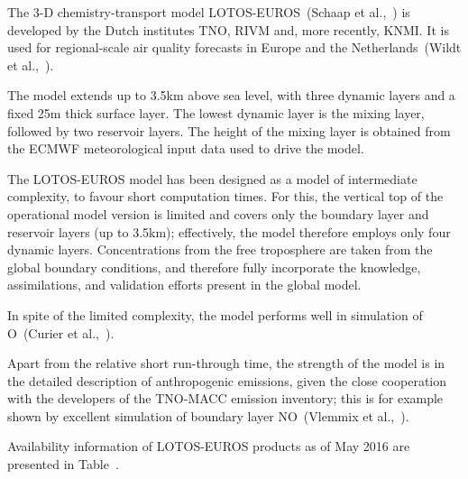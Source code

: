 \documentclass[9pt]{report}
\begin{document}
\noindent{}The 3-D chemistry-transport model LOTOS-EUROS~(Schaap et al.,~) is developed by the Dutch institutes TNO, RIVM and, more recently, KNMI.
It is used for regional-scale air quality forecasts in Europe and the Netherlands~(Wildt et al.,~).%

The model extends up to 3.5km above sea level, with three dynamic layers and a ﬁxed 25m thick surface layer.
The lowest dynamic layer is the mixing layer, followed by two reservoir layers.
The height of the mixing layer is obtained from the ECMWF meteorological input data used to drive the model.%

The LOTOS-EUROS model has been designed as a model of intermediate complexity, to favour short computation times.
For this, the vertical top of the operational model version is limited and covers only the boundary layer and reservoir layers (up to 3.5km); effectively, the model therefore employs only four dynamic layers.
Concentrations from the free troposphere are taken from the global boundary conditions, and therefore fully incorporate the knowledge, assimilations, and validation efforts present in the global model.%

In spite of the limited complexity, the model performs well in simulation of O~(Curier et al.,~).%

Apart from the relative short run-through time, the strength of the model is in the detailed description of anthropogenic emissions, given the close cooperation with the developers of the TNO-MACC emission inventory; this is for example shown by excellent simulation of boundary layer NO~(Vlemmix et al.,~).%

Availability information of LOTOS-EUROS products as of May 2016 are presented in Table~.%
\end{document}
